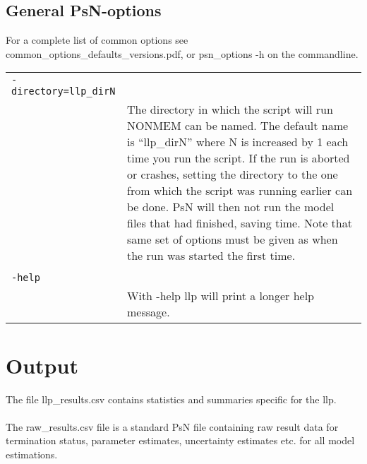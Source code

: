 \documentclass[a4paper,12pt]{article}
\begin{document}
\subsection{General PsN-options}

For a complete list of common options see common\_options\_defaults\_versions.pdf, or psn\_options -h on the commandline.

\begin{longtable}{p{1in}p{4in}}
\verb|-directory=llp_dirN| & \\
\nopagebreak
 & The directory in which the script will run NONMEM can be named. The default name is “llp\_dirN” where N is increased by 1 each time you run the script. If the run is aborted or crashes, setting the directory to the one from which the script was running earlier can be done. PsN will then not run the model files that had finished, saving time. Note that same set of options must be given as when the run was started the first time. \\
\\
\verb|-help| & \\
\nopagebreak
 & With -help llp will print a longer help message. \\
\end{longtable}


\section{Output}

The file llp\_results.csv contains statistics and summaries specific for the llp. \\
\\
The raw\_results.csv file is a standard PsN file containing raw result data for termination status, parameter estimates, uncertainty estimates etc. for all model estimations. 
\end{document}
